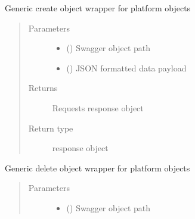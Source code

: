 \documentclass[letterpaper,10pt,english]{sphinxmanual}
\begin{document}
\begin{fulllineitems}
\begin{fulllineitems}
\end{fulllineitems}


\begin{fulllineitems}
\label{\detokenize{b1oph-class:bloxone.b1oph.create}}
\sphinxAtStartPar
Generic create object wrapper for platform objects
\begin{quote}\begin{description}
\item[{Parameters}] \leavevmode\begin{itemize}
\item {} 
\sphinxAtStartPar
{} () \textendash{} Swagger object path

\item {} 
\sphinxAtStartPar
{} () \textendash{} JSON formatted data payload

\end{itemize}

\item[{Returns}] \leavevmode
\sphinxAtStartPar
Requests response object

\item[{Return type}] \leavevmode
\sphinxAtStartPar
response object

\end{description}\end{quote}

\end{fulllineitems}


\begin{fulllineitems}
\label{\detokenize{b1oph-class:bloxone.b1oph.delete}}
\sphinxAtStartPar
Generic delete object wrapper for platform objects
\begin{quote}\begin{description}
\item[{Parameters}] \leavevmode\begin{itemize}
\item {} 
\sphinxAtStartPar
{} () \textendash{} Swagger object path


\end{itemize}
\end{description}
\end{quote}
\end{fulllineitems}
\end{fulllineitems}
\end{document}
